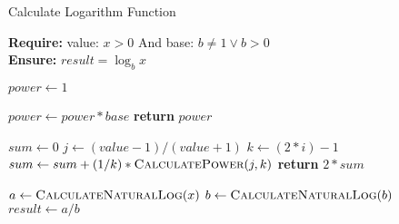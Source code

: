 \documentclass{article}
\begin{document}
\begin{algorithm}

\caption{Calculate Logarithm Function}

\textbf{Require:}  value: $x > 0$ And base: $b \neq 1 \vee b > 0$ \\
\textbf{Ensure:} $result = \log_b x$
\begin{algorithmic}[1]

    \State $power \leftarrow 1$
    
    \State $power \leftarrow power * base$
    \EndFor
    \State \textbf{return} $power$
    \EndProcedure
\Statex

    \State $sum \leftarrow 0$
    \State $j \leftarrow (value-1) / (value+1)$
    \State $k \leftarrow (2 * i) -1$
    \State $sum \leftarrow sum + (1/k) * \Call{CalculatePower}{j,k} $
    \EndFor
    \State \textbf{return} $2*sum$
    \EndProcedure
\Statex

\State $ a \leftarrow \Call{CalculateNaturalLog}{x}$
\State $ b \leftarrow \Call{CalculateNaturalLog}{b}$
\State $result \leftarrow a/b $

\end{algorithmic}
\end{algorithm}
\end{document}

